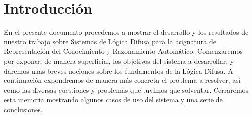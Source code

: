 \section{Introducción}

En el presente documento procedemos a mostrar el desarrollo y los resultados de nuestro trabajo sobre Sistemas de Lógica Difusa para la asignatura de Representación del Conocimiento y Razonamiento Automático.
Comenzaremos por exponer, de manera superficial, los objetivos del sistema a desarrollar, y daremos unas breves nociones sobre los fundamentos de la Lógica Difusa. A continuación expondremos de manera más concreta el problema a resolver, así como las diversas cuestiones y problemas que tuvimos que solventar. 
Cerraremos esta memoria mostrando algunos casos de uso del sistema y una serie de conclusiones.